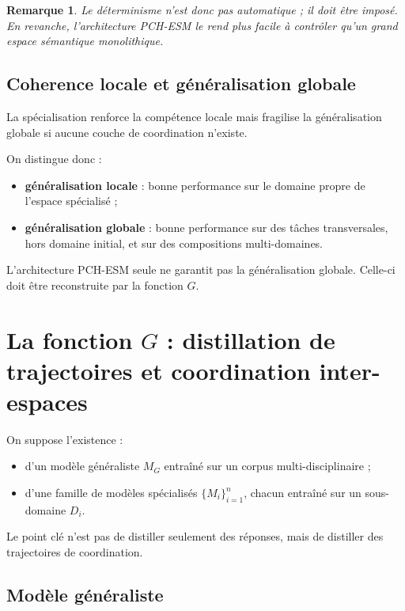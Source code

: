 \documentclass[11pt,a4paper]{article}
\newtheorem{remark}{Remarque}[section]
\newcommand{\1}{\mathbf 1}
\begin{document}
\begin{remark}
Le déterminisme n'est donc pas automatique ; il doit être imposé. En revanche, l'architecture PCH-ESM le rend plus facile à contrôler qu'un grand espace sémantique monolithique.
\end{remark}

\subsection{Coherence locale et généralisation globale}

La spécialisation renforce la compétence locale mais fragilise la généralisation globale si aucune couche de coordination n'existe.

On distingue donc :

\begin{itemize}[leftmargin=2em]
    \item \textbf{généralisation locale} : bonne performance sur le domaine propre de l'espace spécialisé ;
    \item \textbf{généralisation globale} : bonne performance sur des tâches transversales, hors domaine initial, et sur des compositions multi-domaines.
\end{itemize}

L'architecture PCH-ESM seule ne garantit pas la généralisation globale. Celle-ci doit être reconstruite par la fonction \(G\).

\section{La fonction \(G\) : distillation de trajectoires et coordination inter-espaces}

On suppose l'existence :

\begin{itemize}[leftmargin=2em]
    \item d'un modèle généraliste \(M_G\) entraîné sur un corpus multi-disciplinaire ;
    \item d'une famille de modèles spécialisés \(\{M_i\}_{i=1}^n\), chacun entraîné sur un sous-domaine \(D_i\).
\end{itemize}

Le point clé n'est pas de distiller seulement des réponses, mais de distiller des trajectoires de coordination.

\subsection{Modèle généraliste}
\end{document}
